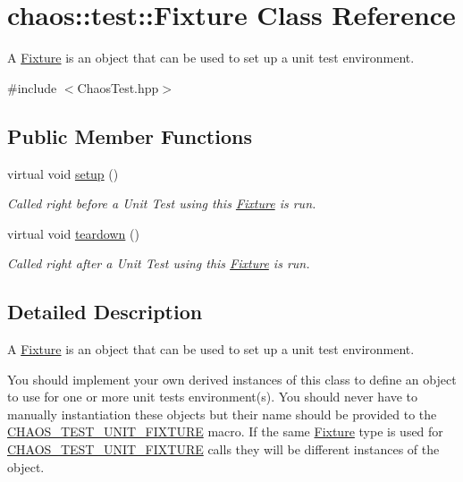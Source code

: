 \hypertarget{classchaos_1_1test_1_1_fixture}{}\section{chaos\+:\+:test\+:\+:Fixture Class Reference}
\label{classchaos_1_1test_1_1_fixture}


A \hyperlink{classchaos_1_1test_1_1_fixture}{Fixture} is an object that can be used to set up a unit test environment.  




{\ttfamily \#include $<$Chaos\+Test.\+hpp$>$}

\subsection*{Public Member Functions}
\begin{DoxyCompactItemize}
\item 
virtual void \hyperlink{classchaos_1_1test_1_1_fixture_a24819cdf1af94789cb66a95f736f53c5}{setup} ()
\begin{DoxyCompactList}\small\item\em Called right before a Unit Test using this \hyperlink{classchaos_1_1test_1_1_fixture}{Fixture} is run. \end{DoxyCompactList}\item 
virtual void \hyperlink{classchaos_1_1test_1_1_fixture_ae8ea21c5226a988b64f0b2d166bc4a5e}{teardown} ()
\begin{DoxyCompactList}\small\item\em Called right after a Unit Test using this \hyperlink{classchaos_1_1test_1_1_fixture}{Fixture} is run. \end{DoxyCompactList}\end{DoxyCompactItemize}


\subsection{Detailed Description}
A \hyperlink{classchaos_1_1test_1_1_fixture}{Fixture} is an object that can be used to set up a unit test environment. 

You should implement your own derived instances of this class to define an object to use for one or more unit test\textquotesingle{}s environment(s). You should never have to manually instantiation these objects but their name should be provided to the \hyperlink{_chaos_test_8hpp_a1b96815684faab06af818b7d497e89fb}{C\+H\+A\+O\+S\+\_\+\+T\+E\+S\+T\+\_\+\+U\+N\+I\+T\+\_\+\+F\+I\+X\+T\+U\+R\+E} macro. If the same \hyperlink{classchaos_1_1test_1_1_fixture}{Fixture} type is used for \hyperlink{_chaos_test_8hpp_a1b96815684faab06af818b7d497e89fb}{C\+H\+A\+O\+S\+\_\+\+T\+E\+S\+T\+\_\+\+U\+N\+I\+T\+\_\+\+F\+I\+X\+T\+U\+R\+E} calls they will be different instances of the object. 


